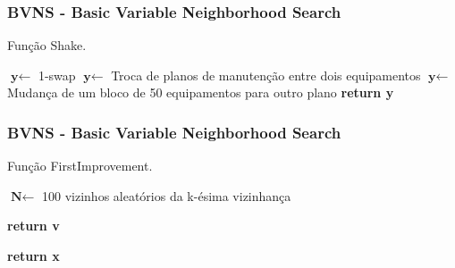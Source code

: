 \documentclass{beamer}
\begin{document}
    \begin{frame}
        \frametitle{BVNS - Basic Variable Neighborhood Search}
        \begin{algorithm}[H]
            \caption{Função Shake.}\label{alg:shake}
            \begin{algorithmic}[1]
                    \State $\textbf{y} \gets$ 1-swap
                \EndIf
                    \State $\textbf{y} \gets$ Troca de planos de manutenção entre dois equipamentos
                \EndIf
                    \State $\textbf{y} \gets$ Mudança de um bloco de 50 equipamentos para outro plano
                \EndIf
            \Statex
            \State \textbf{return y} 

            \EndProcedure 
            \end{algorithmic}
        \end{algorithm}
    \end{frame}

    \begin{frame}
        \frametitle{BVNS - Basic Variable Neighborhood Search}
        \begin{algorithm}[H]
            \caption{Função FirstImprovement.}\label{alg:first-improvement}

            \begin{algorithmic}[1]

            \State $\textbf{N} \gets$ 100 vizinhos aleatórios da k-ésima vizinhança


                    \State \textbf{return v} 
                \EndIf
            \EndFor
               
            \Statex
            \State \textbf{return x} 
            \EndProcedure 
            \end{algorithmic}
        \end{algorithm}
    \end{frame}
\end{document}
